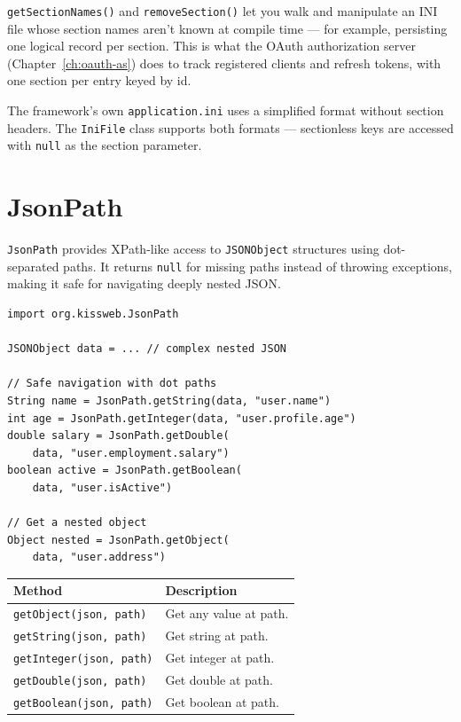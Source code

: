 \noindent
\texttt{getSectionNames()} and \texttt{removeSection()} let you walk and manipulate an INI file whose section names aren't known at compile time --- for example, persisting one logical record per section.  This is what the OAuth authorization server (Chapter~\ref{ch:oauth-as}) does to track registered clients and refresh tokens, with one section per entry keyed by id.

\begin{notebox}
The framework's own \texttt{application.ini} uses a simplified format without section headers.  The \texttt{IniFile} class supports both formats --- sectionless keys are accessed with \texttt{null} as the section parameter.
\end{notebox}

\section{JsonPath}
\label{sec:util-jsonpath}

\texttt{JsonPath} provides XPath-like access to \texttt{JSONObject} structures using dot-separated paths.  It returns \texttt{null} for missing paths instead of throwing exceptions, making it safe for navigating deeply nested JSON.

\begin{lstlisting}[style=groovy]
import org.kissweb.JsonPath

JSONObject data = ... // complex nested JSON

// Safe navigation with dot paths
String name = JsonPath.getString(data, "user.name")
int age = JsonPath.getInteger(data, "user.profile.age")
double salary = JsonPath.getDouble(
    data, "user.employment.salary")
boolean active = JsonPath.getBoolean(
    data, "user.isActive")

// Get a nested object
Object nested = JsonPath.getObject(
    data, "user.address")
\end{lstlisting}

\begin{longtable}{P{4.8cm}P{5.7cm}}
\toprule
\textbf{Method} & \textbf{Description} \\
\midrule
\endhead
\texttt{getObject(json, path)} & Get any value at path. \\
\texttt{getString(json, path)} & Get string at path. \\
\texttt{getInteger(json, path)} & Get integer at path. \\
\texttt{getDouble(json, path)} & Get double at path. \\
\texttt{getBoolean(json, path)} & Get boolean at path. \\
\bottomrule
\end{longtable}

